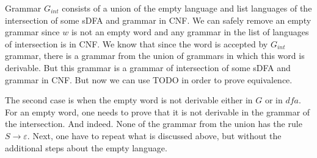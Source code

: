 Grammar $G_{int}$ consists of a union of the empty language and list languages of the intersection of some sDFA and grammar in CNF. We can safely remove an empty grammar since $w$ is not an empty word and any grammar in the list of languages of intersection is in CNF.
We know that since the word is accepted by $G_{int}$ grammar, there is a grammar from the union of grammars in which this word is derivable.
But this grammar is a grammar of intersection of some sDFA and grammar in CNF. But now we can use TODO in order to prove equivalence.

The second case is when the empty word is not derivable either in $G$ or in $dfa$.
For an empty word, one needs to prove that it is not derivable in the grammar of the intersection. 
And indeed. None of the grammar from the union has the rule $S \to \varepsilon$. 
Next, one have to repeat what is discussed above, but without the additional steps about the empty language.